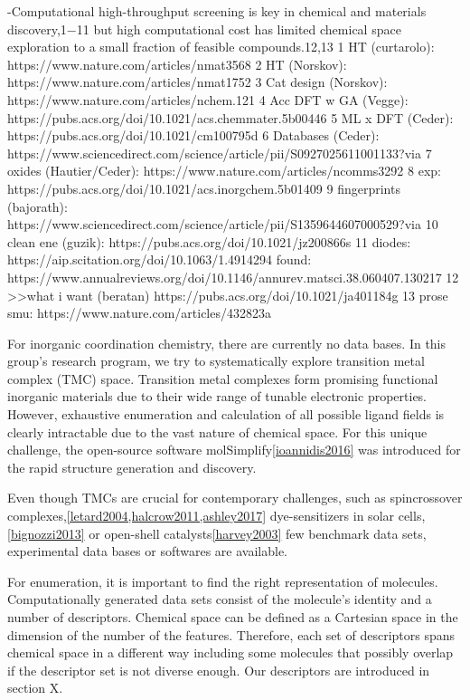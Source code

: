 \documentclass{article}
\begin{document}
-Computational high-throughput screening is key in chemical
and materials discovery,1−11 but high computational cost has
limited chemical space exploration to a small fraction of feasible
compounds.12,13
1 HT (curtarolo): https://www.nature.com/articles/nmat3568
2 HT (Norskov): https://www.nature.com/articles/nmat1752
3 Cat design (Norskov): https://www.nature.com/articles/nchem.121
4 Acc DFT w GA (Vegge): https://pubs.acs.org/doi/10.1021/acs.chemmater.5b00446
5 ML x DFT (Ceder): https://pubs.acs.org/doi/10.1021/cm100795d
6 Databases (Ceder): https://www.sciencedirect.com/science/article/pii/S0927025611001133?via%
7 oxides (Hautier/Ceder): https://www.nature.com/articles/ncomms3292
8 exp: https://pubs.acs.org/doi/10.1021/acs.inorgchem.5b01409
9 fingerprints (bajorath): https://www.sciencedirect.com/science/article/pii/S1359644607000529?via%
10 clean ene (guzik): https://pubs.acs.org/doi/10.1021/jz200866s
11 diodes: https://aip.scitation.org/doi/10.1063/1.4914294
found: https://www.annualreviews.org/doi/10.1146/annurev.matsci.38.060407.130217
12 >>what i want (beratan) https://pubs.acs.org/doi/10.1021/ja401184g
13 prose smu: https://www.nature.com/articles/432823a

For inorganic coordination chemistry, there are currently no data bases. In this group's research program, we try to systematically explore transition metal complex (TMC) space. Transition metal complexes form promising functional inorganic materials due to their wide range of tunable electronic properties. However, exhaustive enumeration and calculation of all possible ligand fields is clearly intractable due to the vast nature of chemical space. For this unique challenge, the open-source software molSimplify\ref{ioannidis2016} was introduced for the rapid structure generation and discovery. 

Even though TMCs are crucial for contemporary challenges, such as spincrossover complexes,\ref{letard2004,halcrow2011,ashley2017} dye-sensitizers in solar cells,\ref{bignozzi2013} or open-shell catalysts\ref{harvey2003} few benchmark data sets, experimental data bases or softwares are available. 

For enumeration, it is important to find the right representation of molecules. Computationally generated data sets consist of the molecule's identity and a number of descriptors. Chemical space can be defined as a Cartesian space in the dimension of the number of the features. Therefore, each set of descriptors spans chemical space in a different way including some molecules that possibly overlap if the descriptor set is not diverse enough. Our descriptors are introduced in section X.
\end{document}
